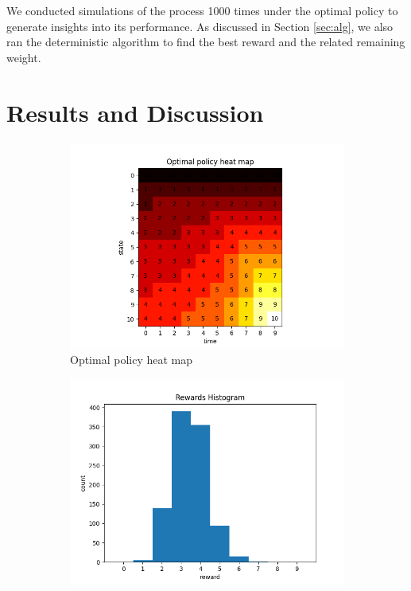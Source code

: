 We conducted simulations of the process 1000 times under the optimal policy to generate insights into its performance. As discussed in Section \ref{sec:alg}, we also ran the deterministic algorithm to find the best reward and the related remaining weight.

\section{Results and Discussion}

\begin{figure}[htbp]
    \centering
    \begin{subfigure}[htbp]{0.24\textwidth}
        \centering
        \includegraphics[width=\textwidth]{fig/asg1_ploicymap.png}
        \caption{Optimal policy heat map}
        \label{fig:fig_2}
    \end{subfigure}
    \hfill
    \begin{subfigure}[htbp]{0.24\textwidth}
        \centering
        \includegraphics[width=\textwidth]{fig/asg1_reward_hist.png}

\end{subfigure}
\end{figure}
